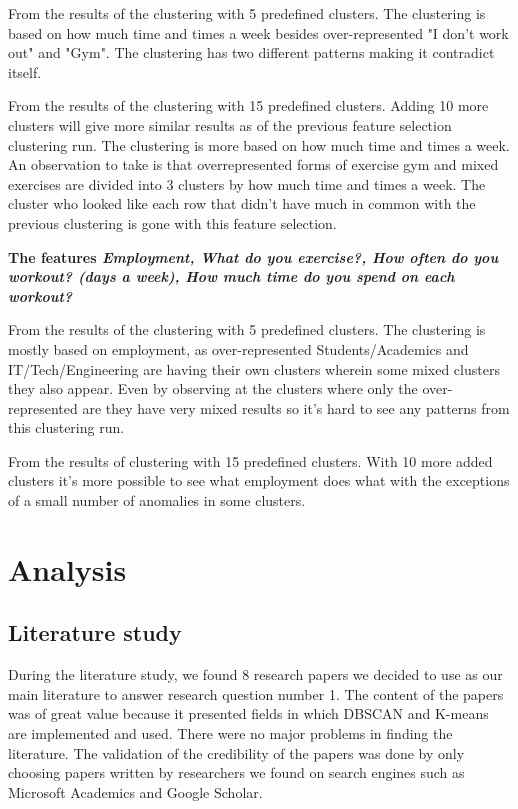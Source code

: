 \documentclass[a4paper]{article}
\begin{document}
From the results of the clustering with 5 predefined clusters. The clustering is based on how much time and times a week besides over-represented "I don't work out" and "Gym". The clustering has two different patterns making it contradict itself.

From the results of the clustering with 15 predefined clusters. Adding 10 more clusters will give more similar results as of the previous feature selection clustering run.  The clustering is more based on how much time and times a week. An observation to take is that overrepresented forms of exercise gym and mixed exercises are divided into 3 clusters by how much time and times a week. The cluster who looked like each row that didn't have much in common with the previous clustering is gone with this feature selection.

\textbf{The features \textit{Employment, What do you exercise?, How often do you workout? (days a week), How much time do you spend on each workout?}}

From the results of the clustering with 5 predefined clusters. The clustering is mostly based on employment, as over-represented Students/Academics and IT/Tech/Engineering are having their own clusters wherein some mixed clusters they also appear. Even by observing at the clusters where only the over-represented are they have very mixed results so it's hard to see any patterns from this clustering run.

From the results of clustering with 15 predefined clusters. With 10 more added clusters it's more possible to see what employment does what with the exceptions of a small number of anomalies in some clusters. 


\newpage
\section{Analysis}

\subsection{Literature study}
During the literature study, we found 8 research papers we decided to use as our main literature to answer research question number 1. The content of the papers was of great value because it presented fields in which DBSCAN and K-means are implemented and used. There were no major problems in finding the literature. The validation of the credibility of the papers was done by only choosing papers written by researchers we found on search engines such as Microsoft Academics and Google Scholar. 
\end{document}
